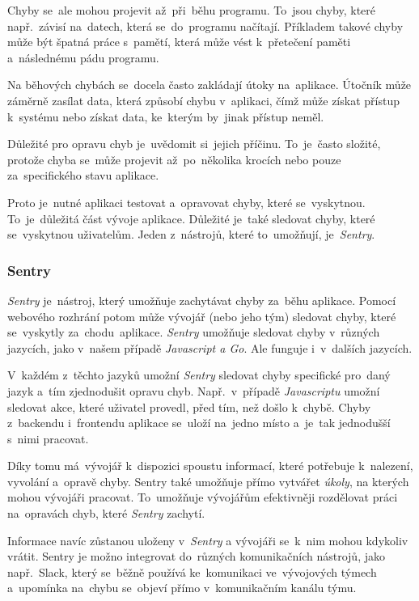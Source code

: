 \documentclass[10pt,a4paper]{article}
\begin{document}
            Chyby se~ale mohou projevit až~při~běhu programu. To~jsou chyby, které např.~závisí na~datech, která se~do~programu načítají. Příkladem takové chyby může být špatná práce s~pamětí, která může vést k~přetečení paměti a~následnému pádu programu.

            Na běhových chybách se~docela často zakládají útoky na~aplikace. Útočník může záměrně zasílat data, která způsobí chybu v~aplikaci, čímž může získat přístup k~systému nebo získat data, ke~kterým by~jinak přístup neměl.

            Důležité pro opravu chyb je~uvědomit si~jejich příčinu. To~je~často složité, protože chyba se~může projevit až~po~několika krocích nebo pouze za~specifického stavu aplikace.

            Proto je~nutné aplikaci testovat a~opravovat chyby, které se~vyskytnou. To~je~důležitá část vývoje aplikace. Důležité je~také sledovat chyby, které se~vyskytnou uživatelům. Jeden z~nástrojů, které to~umožňují, je~\emph{Sentry}.

            \subsubsection{Sentry}
            \emph{Sentry} je~nástroj, který umožňuje zachytávat chyby za~běhu aplikace. Pomocí webového rozhrání potom může vývojář (nebo jeho tým) sledovat chyby, které se~vyskytly za~chodu~aplikace. \emph{Sentry} umožňuje sledovat chyby v~různých jazycích, jako v~našem případě \emph{Javascript a Go}. Ale funguje i~v~dalších jazycích.


            V~každém z~těchto jazyků umožní \emph{Sentry} sledovat chyby specifické pro~daný jazyk a~tím zjednodušit opravu chyb. Např.~v~případě \emph{Javascriptu} umožní sledovat akce, které uživatel provedl, před tím, než došlo k~chybě. Chyby z~backendu i~frontendu aplikace se~uloží na~jedno místo a~je~tak jednodušší s~nimi pracovat.

            Díky tomu má~vývojář k~dispozici spoustu informací, které potřebuje k~nalezení, vyvolání a~opravě chyby. Sentry také umožňuje přímo vytvářet \emph{úkoly}, na kterých mohou vývojáři pracovat. To~umožňuje vývojářům efektivněji rozdělovat práci na~opravách chyb, které \emph{Sentry} zachytí.

            Informace navíc zůstanou uloženy v~\emph{Sentry} a vývojáři se~k~nim mohou kdykoliv vrátit. Sentry je možno integrovat do~různých komunikačních nástrojů, jako např.~Slack, který se~běžně používá ke~komunikaci ve~vývojových týmech a~upomínka na~chybu se~objeví přímo v~komunikačním kanálu týmu.
	
\end{document}
